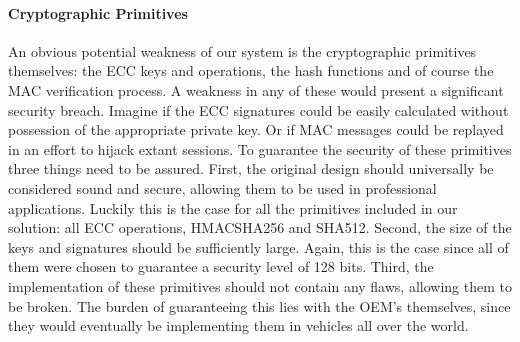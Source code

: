 \paragraph{Cryptographic Primitives} An obvious potential weakness of our system is the cryptographic primitives themselves: the ECC keys and operations, the hash functions and of course the MAC verification process. A weakness in any of these would present a significant security breach. Imagine if the ECC signatures could be easily calculated without possession of the appropriate private key. Or if MAC messages could be replayed in an effort to hijack extant sessions. To guarantee the security of these primitives three things need to be assured. First, the original design should universally be considered sound and secure, allowing them to be used in professional applications. Luckily this is the case for all the primitives included in our solution: all ECC operations, HMAC\textunderscore SHA256 and SHA512. Second, the size of the keys and signatures should be sufficiently large. Again, this is the case since all of them were chosen to guarantee a security level of 128 bits. Third, the implementation of these primitives should not contain any flaws, allowing them to be broken. The burden of guaranteeing this lies with the OEM's themselves, since they would eventually be implementing them in vehicles all over the world. 

